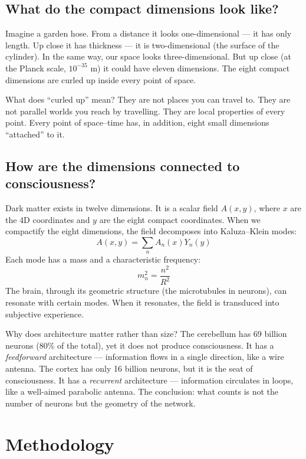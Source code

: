 \documentclass[11pt,a4paper]{article}
\begin{document}
\subsection{What do the compact dimensions look like?}
Imagine a garden hose. From a distance it looks one-dimensional --- it has only length. Up close it has thickness --- it is two-dimensional (the surface of the cylinder). In the same way, our space looks three-dimensional. But up close (at the Planck scale, $10^{-35}$ m) it could have eleven dimensions. The eight compact dimensions are curled up inside every point of space.

What does ``curled up'' mean? They are not places you can travel to. They are not parallel worlds you reach by travelling. They are local properties of every point. Every point of space--time has, in addition, eight small dimensions ``attached'' to it.

\subsection{How are the dimensions connected to consciousness?}
Dark matter exists in twelve dimensions. It is a scalar field $A(x,y)$, where $x$ are the 4D coordinates and $y$ are the eight compact coordinates. When we compactify the eight dimensions, the field decomposes into Kaluza--Klein modes:
\begin{equation}
A(x,y) = \sum_n A_n(x) Y_n(y)
\end{equation}
Each mode has a mass and a characteristic frequency:
\begin{equation}
m_n^2 = \frac{n^2}{R^2}
\end{equation}
The brain, through its geometric structure (the microtubules in neurons), can resonate with certain modes. When it resonates, the field is transduced into subjective experience.

Why does architecture matter rather than size? The cerebellum has 69 billion neurons (80\% of the total), yet it does not produce consciousness. It has a \textit{feedforward} architecture --- information flows in a single direction, like a wire antenna. The cortex has only 16 billion neurons, but it is the seat of consciousness. It has a \textit{recurrent} architecture --- information circulates in loops, like a well-aimed parabolic antenna. The conclusion: what counts is not the number of neurons but the geometry of the network.

\section{Methodology}
\end{document}
